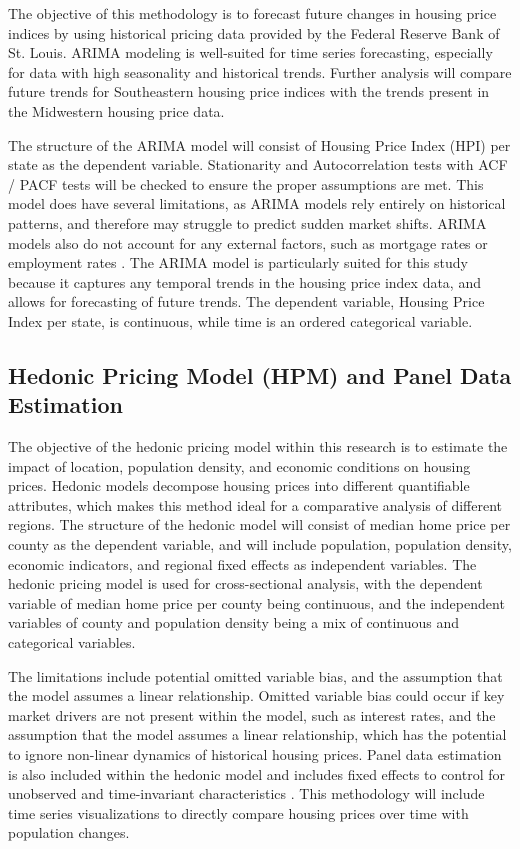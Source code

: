 \documentclass[journal,article,submit,pdftex,moreauthors]{Definitions/mdpi}
\begin{document}
The objective of this methodology is to forecast future changes in housing price indices by using historical pricing data provided by the Federal Reserve Bank of St. Louis. ARIMA modeling is well-suited for time series forecasting, especially for data with high seasonality and historical trends. Further analysis will compare future trends for Southeastern housing price indices with the trends present in the Midwestern housing price data.

The structure of the ARIMA model will consist of Housing Price Index (HPI) per state as the dependent variable. Stationarity and Autocorrelation tests with ACF / PACF tests will be checked to ensure the proper assumptions are met. This model does have several limitations, as ARIMA models rely entirely on historical patterns, and therefore may struggle to predict sudden market shifts. ARIMA models also do not account for any external factors, such as mortgage rates or employment rates \citep{liu_2024_navigating}. The ARIMA model is particularly suited for this study because it captures any temporal trends in the housing price index data, and allows for forecasting of future trends. The dependent variable, Housing Price Index per state, is continuous, while time is an ordered categorical variable.

\subsection{Hedonic Pricing Model (HPM) and Panel Data Estimation}

The objective of the hedonic pricing model within this research is to estimate the impact of location, population density, and economic conditions on housing prices. Hedonic models decompose housing prices into different quantifiable attributes, which makes this method ideal for a comparative analysis of different regions. The structure of the hedonic model will consist of median home price per county as the dependent variable, and will include population, population density, economic indicators, and regional fixed effects as independent variables. The hedonic pricing model is used for cross-sectional analysis, with the dependent variable of median home price per county being continuous, and the independent variables of county and population density being a mix of continuous and categorical variables.

The limitations include potential omitted variable bias, and the assumption that the model assumes a linear relationship. Omitted variable bias could occur if key market drivers are not present within the model, such as interest rates, and the assumption that the model assumes a linear relationship, which has the potential to ignore non-linear dynamics of historical housing prices. Panel data estimation is also included within the hedonic model and includes fixed effects to control for unobserved and time-invariant characteristics \citep{torresreyna_2010_getting}. This methodology will include time series visualizations to directly compare housing prices over time with population changes.
\end{document}
